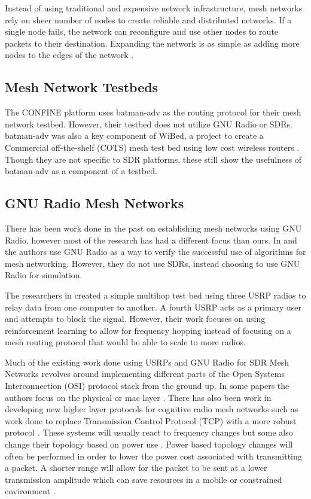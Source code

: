 Instead of using traditional and expensive network infrastructure, mesh networks rely on sheer number of nodes to create reliable and distributed networks. If a single node fails, the network can reconfigure and use other nodes to route packets to their destination. Expanding the network is as simple as adding more nodes to the edges of the network \cite{6908725}. 

\subsection{Mesh Network Testbeds}

The CONFINE platform uses batman-adv as the routing protocol for their mesh network testbed. However, their testbed does not utilize GNU Radio or SDRs. \cite{0001} batman-adv was also a key component of WiBed, a project to create a Commercial off-the-shelf (COTS) mesh test bed using low cost wireless routers \cite{6686492} \cite{6962154}. Though they are not specific to SDR platforms, these still show the usefulness of batman-adv as a component of a testbed. 

\subsection{GNU Radio Mesh Networks}

There has been work done in the past on establishing mesh networks using GNU Radio, however most of the research has had a different focus than ours. In \cite{4509617} and \cite{5062250} the authors use GNU Radio as a way to verify the successful use of algorithms for mesh networking. However, they do not use SDRs, instead choosing to use GNU Radio for simulation. 

The researchers in \cite{7141228} created a simple multihop test bed using three USRP radios to relay data from one computer to another. A fourth USRP acts as a primary user and attempts to block the signal. However, their work focuses on using reinforcement learning to allow for frequency hopping instead of focusing on a mesh routing protocol that would be able to scale to more radios. 

Much of the existing work done using USRPs and GNU Radio for SDR Mesh Networks revolves around implementing different parts of the Open Systems Interconnection (OSI) protocol stack from the ground up. In some papers the authors focus on the physical or mac layer \cite{5508221}. There has also been work in developing new higher layer protocols for cognitive radio mesh networks such as work done to replace Transmission Control Protocol (TCP) with a more robust protocol \cite{6686523}. These systems will usually react to frequency changes but some also change their topology based on power use \cite{6983150}. Power based topology changes will often be performed in order to lower the power cost associated with transmitting a packet. A shorter range will allow for the packet to be sent at a lower transmission amplitude which can save resources in a mobile or constrained environment \cite{6983150}.


